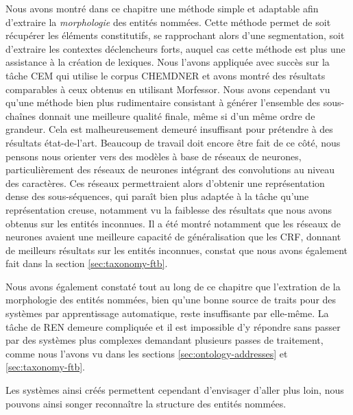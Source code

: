 \documentclass[PhD-Yoann-Dupont.tex]{subfiles}
\begin{document}
Nous avons montré dans ce chapitre une méthode simple et adaptable afin d'extraire la \emph{morphologie} des entités nommées. Cette méthode permet de soit récupérer les éléments constitutifs, se rapprochant alors d'une segmentation, soit d'extraire les contextes déclencheurs forts, auquel cas cette méthode est plus une assistance à la création de lexiques. Nous l'avons appliquée avec succès sur la tâche CEM qui utilise le corpus CHEMDNER et avons montré des résultats comparables à ceux obtenus en utilisant Morfessor. Nous avons cependant vu qu'une méthode bien plus rudimentaire consistant à générer l'ensemble des sous-chaînes donnait une meilleure qualité finale, même si d'un même ordre de grandeur. Cela est malheureusement demeuré insuffisant pour prétendre à des résultats état-de-l'art. Beaucoup de travail doit encore être fait de ce côté, nous pensons nous orienter vers des modèles à base de réseaux de neurones, particulièrement des réseaux de neurones intégrant des convolutions au niveau des caractères. Ces réseaux permettraient alors d'obtenir une représentation dense des sous-séquences, qui paraît bien plus adaptée à la tâche qu'une représentation creuse, notamment vu la faiblesse des résultats que nous avons obtenus sur les entités inconnues. Il a été montré notamment que les réseaux de neurones avaient une meilleure capacité de généralisation que les CRF, donnant de meilleurs résultats sur les entités inconnues, constat que nous avons également fait dans la section \ref{sec:taxonomy-ftb}.

Nous avons également constaté tout au long de ce chapitre que l'extration de la morphologie des entités nommées, bien qu'une bonne source de traits pour des systèmes par apprentissage automatique, reste insuffisante par elle-même. La tâche de REN demeure compliquée et il est impossible d'y répondre sans passer par des systèmes plus complexes demandant plusieurs passes de traitement, comme nous l'avons vu dans les sections \ref{sec:ontology-addresses} et \ref{sec:taxonomy-ftb}.

Les systèmes ainsi créés permettent cependant d'envisager d'aller plus loin, nous pouvons ainsi songer reconnaître la structure des entités nommées.
\end{document}
